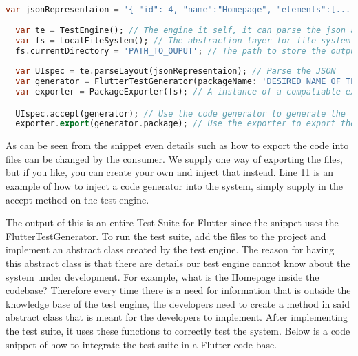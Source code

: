 \begin{lstlisting}[language=dart, caption={How to configure and use the Test Generator Package.}]
  var jsonRepresentaion = '{ "id": 4, "name":"Homepage", "elements":[...]}'; //The output from the Mobile application
  
  var te = TestEngine(); // The engine it self, it can parse the json and use a codegenerator
  var fs = LocalFileSystem(); // The abstraction layer for file system
  fs.currentDirectory = 'PATH_TO_OUPUT'; // The path to store the output test suite
  
  var UIspec = te.parseLayout(jsonRepresentaion); // Parse the JSON
  var generator = FlutterTestGenerator(packageName: 'DESIRED NAME OF TEST PACKAGE'); // An instance of a compatiable code generator
  var exporter = PackageExporter(fs); // A instance of a compatiable exporter.

  UIspec.accept(generator); // Use the code generator to generate the test suite
  exporter.export(generator.package); // Use the exporter to export the test suite to the file system.
\end{lstlisting}

As can be seen from the snippet even details such as how to export the code into files can be changed by the consumer. 
We supply one way of exporting the files, but if you like, you can create your own and inject that instead. 
Line 11 is an example of how to inject a code generator into the system, simply supply in the accept method on the test engine.

The output of this is an entire Test Suite for Flutter since the snippet uses the FlutterTestGenerator. 
To run the test suite, add the files to the project and implement an abstract class created by the test engine. 
The reason for having this abstract class is that there are details our test engine cannot know about the system under development.
For example, what is the Homepage inside the codebase?
Therefore every time there is a need for information that is outside the knowledge base of the test engine, the developers need to create a method in said abstract class that is meant for the developers to implement. 
After implementing the test suite, it uses these functions to correctly test the system.
Below is a code snippet of how to integrate the test suite in a Flutter code base.

